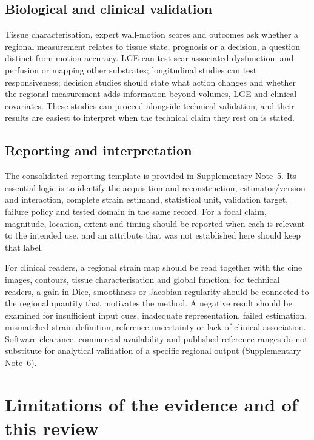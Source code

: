 \subsection{Biological and clinical validation}

Tissue characterisation, expert wall-motion scores and outcomes ask whether a regional measurement relates to tissue state, prognosis or a decision, a question distinct from motion accuracy. LGE can test scar-associated dysfunction, and perfusion or mapping other substrates; longitudinal studies can test responsiveness; decision studies should state what action changes and whether the regional measurement adds information beyond volumes, LGE and clinical covariates. These studies can proceed alongside technical validation, and their results are easiest to interpret when the technical claim they rest on is stated.

\subsection{Reporting and interpretation}

The consolidated reporting template is provided in Supplementary Note~5. Its essential logic is to identify the acquisition and reconstruction, estimator/version and interaction, complete strain estimand, statistical unit, validation target, failure policy and tested domain in the same record. For a focal claim, magnitude, location, extent and timing should be reported when each is relevant to the intended use, and an attribute that was not established here should keep that label.

For clinical readers, a regional strain map should be read together with the cine images, contours, tissue characterisation and global function; for technical readers, a gain in Dice, smoothness or Jacobian regularity should be connected to the regional quantity that motivates the method. A negative result should be examined for insufficient input cues, inadequate representation, failed estimation, mismatched strain definition, reference uncertainty or lack of clinical association. Software clearance, commercial availability and published reference ranges do not substitute for analytical validation of a specific regional output (Supplementary Note~6).

\section{Limitations of the evidence and of this review}

